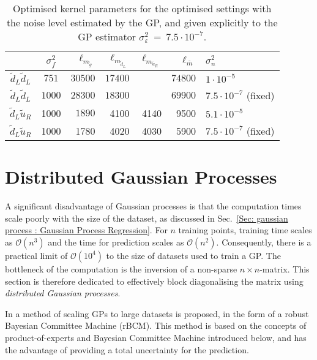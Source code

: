 \documentclass[twoside,english]{uiofysmaster}
\begin{document}
{{\begin{table}
\centering
\begin{tabular}{@{}ccrrrrl@{}} \toprule
& $\sigma_f^2$ & $\ell_{m_{\widetilde{g}}}$ & $\ell_{m_{\widetilde{d}_L}}$ &$\ell_{m_{\widetilde{u}_R}}$ & $\ell_{\bar{m}}$ & $\sigma_n^2$\\
\midrule
$\widetilde{d}_L \widetilde{d}_L$ & $751$ & $30500$ & $17400$ && $74800$ & $1 \cdot 10^{-5}$\\
$\widetilde{d}_L \widetilde{d}_L$ & $1000$ &  $28300$ & $18300$ && $69900$ & $7.5 \cdot 10^{-7}$ (fixed)\\
$\widetilde{d}_L \widetilde{u}_R$ & 1000 & $1890$  & 4100 & 4140 & 9500 & $5.1 \cdot 10^{-5}$\\
$\widetilde{d}_L \widetilde{u}_R$ & 1000& 1780&4020 &4030&5900 & $7.5 \cdot 10^{-7}$ (fixed)\\ \bottomrule
\end{tabular}
\caption{Optimised kernel parameters for the optimised settings with the noise level estimated by the GP, and given explicitly to the GP estimator $\sigma_{\varepsilon}^2~=~7.5 \cdot 10^{-7}$.}
\label{Tab:: evaluating cross : optimal kernel parameters alpha}
\end{table}


\section{Distributed Gaussian Processes}\label{Sec:: gaussian process : Distributed Gaussian Processes}

A significant disadvantage of Gaussian processes is that the computation times scale poorly with the size of the dataset, as discussed in Sec.~\ref{Sec: gaussian process : Gaussian Process Regression}. For $n$ training points, training time scales as $\mathcal{O}(n^3)$ and the time for prediction scales as $\mathcal{O}(n^2)$. Consequently, there is a practical limit of $\mathcal{O}(10^4)$ to the size of datasets used to train a GP. The bottleneck of the computation is the inversion of a non-sparse $n \times n$-matrix. This section is therefore dedicated to effectively block diagonalising the matrix using \textit{distributed Gaussian processes}.

In \cite{deisenroth2015distributed} a method of scaling GPs to large datasets is proposed, in the form of a robust Bayesian Committee Machine (rBCM). This method is based on the concepts of product-of-experts and Bayesian Committee Machine introduced below, and has the advantage of providing a total uncertainty for the prediction.


}}
\end{document}
